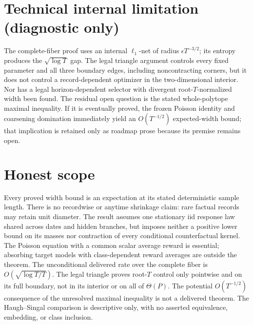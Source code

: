 \documentclass{article}
\begin{document}
\section*{Technical internal limitation (diagnostic only)}

The complete-fiber proof uses an internal \(\ell_1\)-net of radius \(\epsilon T^{-3/2}\); its entropy produces the \(\sqrt{\log T}\) gap. The legal triangle argument controls every fixed parameter and all three boundary edges, including noncontracting corners, but it does not control a record-dependent optimizer in the two-dimensional interior. Nor has a legal horizon-dependent selector with divergent root-\(T\)-normalized width been found. The residual open question is the stated whole-polytope maximal inequality. If it is eventually proved, the frozen Poisson identity and coarsening domination immediately yield an \(O(T^{-1/2})\) expected-width bound; that implication is retained only as roadmap prose because its premise remains open.

\section{Honest scope}

Every proved width bound is an expectation at its stated deterministic sample length. There is no recordwise or anytime shrinkage claim: rare factual records may retain unit diameter. The result assumes one stationary iid response law shared across dates and hidden branches, but imposes neither a positive lower bound on its masses nor contraction of every conditional counterfactual kernel. The Poisson equation with a common scalar average reward is essential; absorbing target models with class-dependent reward averages are outside the theorem. The unconditional delivered rate over the complete fiber is \(O(\sqrt{\log T/T})\). The legal triangle proves root-\(T\) control only pointwise and on its full boundary, not in its interior or on all of \(\Theta(P)\). The potential \(O(T^{-1/2})\) consequence of the unresolved maximal inequality is not a delivered theorem. The Haugh--Singal comparison is descriptive only, with no asserted equivalence, embedding, or class inclusion.
\end{document}
